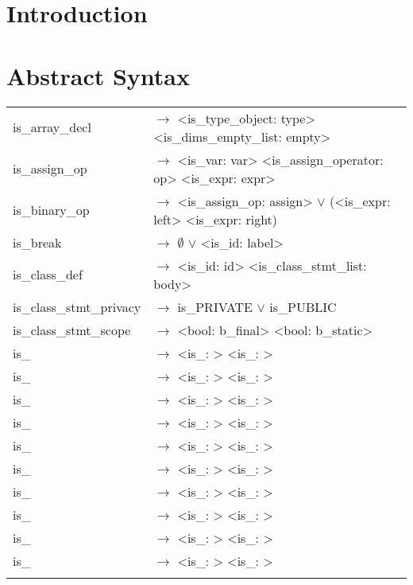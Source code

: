\documentclass[a4paper]{article}
\title{\documentTitle}
\author{\documentAuthors{}}
\begin{document}
\renewcommand{\figurename}{Figure}
\maketitle
\cleardoublepage

\tableofcontents
\cleardoublepage

\setlength{\parindent}{1cm}
\setlength{\parskip}{0.3cm}

\section{Introduction}
\section{Abstract Syntax}
\begin{tabular}{ll}
	is\_array\_decl 			& $\to$ <is\_type\_object: type> <is\_dims\_empty\_list: empty> \\
	is\_assign\_op				& $\to$ <is\_var: var> <is_assign_operator: op> <is\_expr: expr> \\
	is\_binary\_op				& $\to$ <is\_assign\_op: assign> $\vee$ (<is\_expr: left> <is\_expr: right) \\
	is\_break 					& $\to$ $\emptyset$ $\vee$ <is\_id: label> \\
	is\_class\_def				& $\to$ <is\_id: id> <is\_class\_stmt\_list: body> \\
	is\_class\_stmt\_privacy	& $\to$ is\_PRIVATE $\vee$ is\_PUBLIC\\	
	is\_class\_stmt\_scope		& $\to$ <bool: b\_final> <bool: b\_static> \\
	is\_ & $\to$ <is\_: > <is\_: > \\
	is\_ & $\to$ <is\_: > <is\_: > \\
	is\_ & $\to$ <is\_: > <is\_: > \\
	is\_ & $\to$ <is\_: > <is\_: > \\
	is\_ & $\to$ <is\_: > <is\_: > \\
	is\_ & $\to$ <is\_: > <is\_: > \\
	is\_ & $\to$ <is\_: > <is\_: > \\
	is\_ & $\to$ <is\_: > <is\_: > \\
	is\_ & $\to$ <is\_: > <is\_: > \\
	is\_ & $\to$ <is\_: > <is\_: > \\
\begin{comment}

\end{comment}
\end{tabular}
\end{document}
